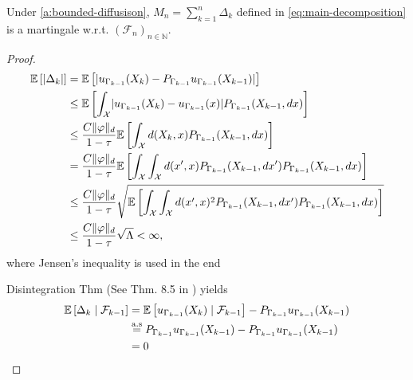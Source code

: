\begin{lemma}
    Under \ref{a:bounded-diffusison}, $M_n = \sum_{k=1}^n \Delta_k$ defined in \eqref{eq:main-decomposition} is a martingale w.r.t. $(\mathcal{F}_n)_{n \in \mathbb{N}}$.
\end{lemma}
\begin{proof}
    \begin{align*}
         \mathbb{E} \left[ \lvert \Delta_k \rvert \right] &=  \mathbb{E} \left[ \lvert {u_{\Gamma_{k-1}}(X_k) - P_{\Gamma_{k-1}}u_{\Gamma_{k-1}}(X_{k-1})} \rvert \right] \\
        &\leq  \mathbb{E} \left[ \int_{\mathcal{X}} \lvert u_{\Gamma_{k-1}}(X_k) - u_{\Gamma_{k-1}}(x) \rvert P_{\Gamma_{k-1}}(X_{k-1}, dx)  \right] \\
        &\leq \frac{C \| \varphi \|_{d}}{1- \tau}  \mathbb{E} \left[ \int_{\mathcal{X}} d(X_k, x) P_{\Gamma_{k-1}}(X_{k-1}, dx)  \right] \\
        &= \frac{C \| \varphi \|_{d}}{1- \tau}  \mathbb{E} \left[ \int_{\mathcal{X}} \int_{\mathcal{X}} d(x', x) 
        P_{\Gamma_{k-1}}(X_{k-1}, dx')
        P_{\Gamma_{k-1}}(X_{k-1}, dx)  \right] \\
        &\leq \frac{C \| \varphi \|_{d}}{1- \tau} \sqrt{ \mathbb{E} \left[ \int_{\mathcal{X}} \int_{\mathcal{X}} d(x', x)^2
        P_{\Gamma_{k-1}}(X_{k-1}, dx')
        P_{\Gamma_{k-1}}(X_{k-1}, dx)  \right] }\\
        &\leq \frac{C \| \varphi \|_{d}}{1- \tau} \sqrt{\Lambda} < \infty,
    \end{align*}
     where Jensen's inequality is used in the end

    Disintegration Thm (See Thm. 8.5 in \cite{kallenberg2021foundations}) yields
    \begin{align*}
        \mathbb{E} \left[ \Delta_k \mid \mathcal{F}_{k-1} \right] &=
        \mathbb{E} \left[  u_{\Gamma_{k-1}}(X_k) \mid \mathcal{F}_{k-1}  \right] - P_{\Gamma_{k-1}}u_{\Gamma_{k-1}}(X_{k-1}) \\
         &\overset{\mathrm{a.s}}{=} P_{\Gamma_{k-1}}u_{\Gamma_{k-1}}(X_{k-1}) - P_{\Gamma_{k-1}}u_{\Gamma_{k-1}}(X_{k-1})  \\
        &= 0
    \end{align*}
\end{proof}

